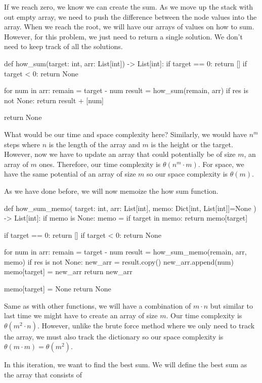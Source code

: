 \documentclass[12pt,dvipsnames,svgnames,x11names]{article}
\begin{document}
If we reach zero, we know we can create the sum. As we move up the stack with out empty array, we 
need to push the difference between the node values into the array. When we reach the root, we will
have our arrays of values on how to sum. However, for this problem, we just need to return a single 
solution. We don't need to keep track of all the solutions.
\begin{python}
def how_sum(target: int, arr: List[int]) -> List[int]:
  if target == 0:
    return []
  if target < 0:
    return None
    
  for num in arr:
    remain = target - num
    result = how_sum(remain, arr)
    if res is not None:
      return result + [num]
      
  return None
\end{python}
What would be our time and space complexity here? Similarly, we would have \(n^m\) steps where 
\(n\) is the length of the array and \(m\) is the height or the target. However, now we have to update an
array that could potentially be of size \(m\), an array of \(m\) ones. Therefore, our time complexity is
\(\theta(n^m\cdot m)\). For space, we have the same potential of an array of size \(m\) so our space
complexity is \(\theta(m)\).
\par\medskip
As we have done before, we will now memoize the how sum function.
\begin{python}
def how_sum_memo(
    target: int, 
    arr: List[int], 
    memo: Dict[int, List[int]]=None
    ) -> List[int]:
  if memo is None:
    memo = {}
  if target in memo:
    return memo[target]
    
  if target == 0:
    return []
  if target < 0:
    return None
    
  for num in arr:
    remain = target - num
    result = how_sum_memo(remain, arr, memo)
    if res is not None:
      new_arr = result.copy()
      new_arr.append(num)
      memo[target] = new_arr
      return new_arr
      
  memo[target] = None
  return None
\end{python}
Same as with other functions, we will have a combination of \(m\cdot n\) but similar to last time we might
have to create an array of size \(m\). Our time complexity is \(\theta (m^2\cdot n)\). However, unlike the 
brute force method where we only need to track the array, we must also track the dictionary so our
space complexity is \(\theta (m\cdot m) = \theta (m^2)\).
\par\medskip
In this iteration, we want to find the best sum. We will define the best sum as the array that consists of
\end{document}
